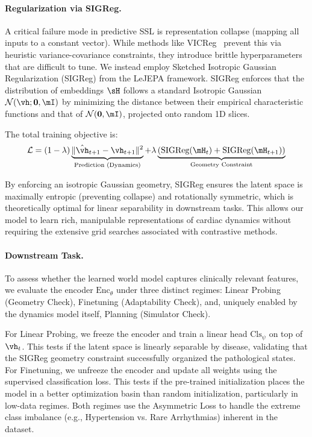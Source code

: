\paragraph{Regularization via SIGReg.}
A critical failure mode in predictive SSL is representation collapse (mapping all inputs to a constant vector). While methods like VICReg~\citep{bardes2021vicreg} prevent this via heuristic variance-covariance constraints, they introduce brittle hyperparameters that are difficult to tune. We instead employ Sketched Isotropic Gaussian Regularization (SIGReg) from the LeJEPA framework. SIGReg enforces that the distribution of embeddings $\sH$ follows a standard Isotropic Gaussian $\mathcal{N}(\vh;\mathbf{0}, \mI)$ by minimizing the distance between their empirical characteristic functions and that of $\mathcal{N}(\mathbf{0},\mI)$, projected onto random 1D slices.

The total training objective is:
$$ \mathcal{L} = (1-\lambda) \underbrace{\| \hat{\vh}_{t+1} - \vh_{t+1} \|^2}_{\text{Prediction (Dynamics)}} + \lambda \underbrace{(\text{SIGReg}(\mH_t) + \text{SIGReg}(\mH_{t+1}))}_{\text{Geometry Constraint}} $$

By enforcing an isotropic Gaussian geometry, SIGReg ensures the latent space is maximally entropic (preventing collapse) and rotationally symmetric, which is theoretically optimal for linear separability in downstream tasks. This allows our model to learn rich, manipulable representations of cardiac dynamics without requiring the extensive grid searches associated with contrastive methods.

\paragraph{Downstream Task.}
To assess whether the learned world model captures clinically relevant features, we evaluate the encoder $\text{Enc}_\theta$ under three distinct regimes: Linear Probing (Geometry Check), Finetuning (Adaptability Check), and, uniquely enabled by the dynamics model itself, Planning (Simulator Check).

For Linear Probing, we freeze the encoder and train a linear head $\text{Cls}_\psi$ on top of $\vh_t$. This tests if the latent space is linearly separable by disease, validating that the SIGReg geometry constraint successfully organized the pathological states. For Finetuning, we unfreeze the encoder and update all weights using the supervised classification loss. This tests if the pre-trained initialization places the model in a better optimization basin than random initialization, particularly in low-data regimes. Both regimes use the Asymmetric Loss to handle the extreme class imbalance (e.g., Hypertension vs. Rare Arrhythmias) inherent in the dataset.

